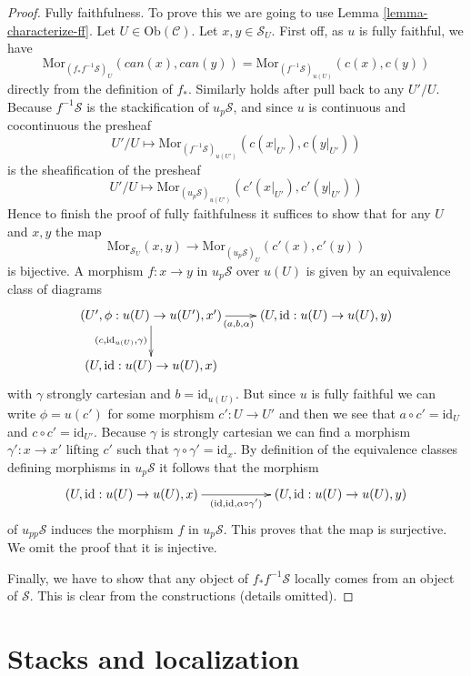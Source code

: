 \begin{proof}
\medskip\noindent
Fully faithfulness. To prove this we are going to use
Lemma \ref{lemma-characterize-ff}.
Let $U \in \text{Ob}(\mathcal{C})$.
Let $x, y \in \mathcal{S}_U$.
First off, as $u$ is fully faithful, we have
$$
\text{Mor}_{(f_*f^{-1}\mathcal{S})_U}(can(x), can(y))
=
\text{Mor}_{(f^{-1}\mathcal{S})_{u(U)}}(c(x), c(y))
$$
directly from the definition of $f_*$. Similarly holds after
pull back to any $U'/U$. Because $f^{-1}\mathcal{S}$ is the
stackification of $u_p\mathcal{S}$, and since $u$ is continuous
and cocontinuous the presheaf
$$
U'/U \longmapsto
\text{Mor}_{(f^{-1}\mathcal{S})_{u(U')}}(c(x|_{U'}), c(y|_{U'}))
$$
is the sheafification of the presheaf
$$
U'/U \longmapsto
\text{Mor}_{(u_p\mathcal{S})_{u(U')}}(c'(x|_{U'}), c'(y|_{U'}))
$$
Hence to finish the proof of fully faithfulness it suffices
to show that for any $U$ and $x, y$ the map
$$
\text{Mor}_{\mathcal{S}_U}(x, y)
\longrightarrow
\text{Mor}_{(u_p\mathcal{S})_U}(c'(x), c'(y))
$$
is bijective. A morphism $f : x \to y$ in $u_p\mathcal{S}$ over $u(U)$
is given by an equivalence class of diagrams
$$
\xymatrix{
(U', \phi : u(U) \to u(U'), x')
\ar[d]_{(c, \text{id}_{u(U)}, \gamma)}
\ar[r]_{(a, b, \alpha)} &
(U, \text{id} : u(U) \to u(U), y)
\\
(U, \text{id} : u(U) \to u(U), x) 
}
$$
with $\gamma$ strongly cartesian and $b = \text{id}_{u(U)}$.
But since $u$ is fully faithful we can write $\phi = u(c')$ for some
morphism $c' : U \to U'$
and then we see that $a \circ c' = \text{id}_U$ and
$c \circ c' = \text{id}_{U'}$. Because $\gamma$ is strongly cartesian
we can find a morphism $\gamma' : x \to x'$ lifting $c'$ such that
$\gamma \circ \gamma' = \text{id}_x$. By definition of the equivalence
classes defining morphisms in $u_p\mathcal{S}$ it follows that
the morphism
$$
\xymatrix{
(U, \text{id} : u(U) \to u(U), x)
\ar[rr]_{(\text{id}, \text{id}, \alpha \circ \gamma')} & &
(U, \text{id} : u(U) \to u(U), y)
}
$$
of $u_{pp}\mathcal{S}$ induces the morphism $f$ in $u_p\mathcal{S}$.
This proves that the map is surjective. We omit the proof that it is
injective.

\medskip\noindent
Finally, we have to show that any object of $f_*f^{-1}\mathcal{S}$
locally comes from an object of $\mathcal{S}$. This is clear from the
constructions (details omitted).
\end{proof}




\section{Stacks and localization}
\label{section-localize}

